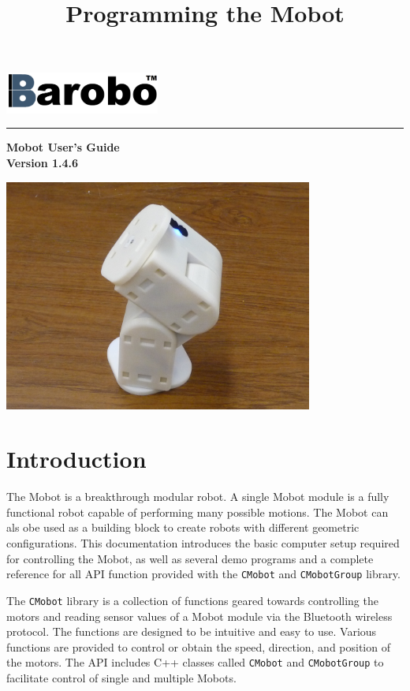 \documentclass{article}
\title{Programming the Mobot}
\begin{document}
\includegraphics[width=2in]{images/Barobo.png}
\hrule
\begin{center}
\vspace*{2.5cm}
{\Huge\sf\bf Mobot User's Guide}\\
\vspace*{2.5cm}
{\Large\bf Version 1.4.6}
\vspace{4.5cm}

\includegraphics[width=4in]{images/Mobot_Camera_Stand.JPG}
\end{center}


\newpage
\tableofcontents
\newpage
\section{Introduction}
The Mobot is a breakthrough modular robot. A single Mobot module is a fully 
functional robot capable of performing many possible motions. The Mobot
can als obe used as a building block to create robots with different
geometric configurations. 
This documentation introduces the basic computer setup required for controlling 
the Mobot, as well as several demo programs and a complete reference for all
API function provided with the \texttt{CMobot} and \texttt{CMobotGroup} library.

The \texttt{CMobot} library is a collection of functions geared towards
controlling the motors and reading sensor values of a Mobot module via the
Bluetooth wireless protocol. The functions are designed to be intuitive
and easy to use. Various functions are provided to control or obtain the speed,
direction, and position of the motors. The API includes C++ classes called
\texttt{CMobot} and \texttt{CMobotGroup} to facilitate control of 
single and multiple Mobots.
\end{document}
